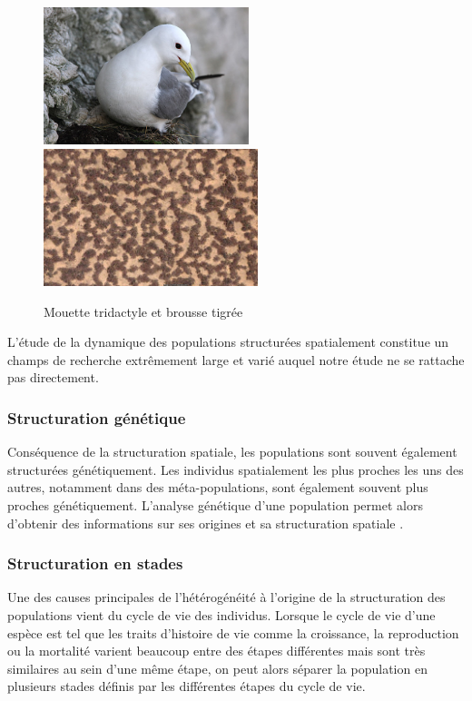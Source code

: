 \begin{figure}[H]
\centering
\includegraphics[height=4cm]{1_CorpsDeThese/EA/Fig/mouette}
\includegraphics[height=4cm]{1_CorpsDeThese/EA/Fig/brousse}
\caption[Mouette tridactyle et brousse
tigrée]{Mouette tridactyle et brousse tigrée}\label{fig:mouette}
\end{figure}

L'étude de la dynamique des populations structurées spatialement constitue un
champs de recherche extrêmement large et varié auquel notre étude ne se rattache
pas directement. 

\subsubsection{Structuration génétique}

Conséquence de la structuration spatiale, les populations sont souvent également
structurées génétiquement. Les individus spatialement les plus proches les uns
des autres, notamment dans des méta-populations, sont également souvent plus
proches génétiquement. L'analyse génétique d'une population permet alors d'obtenir des
informations sur ses origines et sa structuration spatiale
\autocites{repaci2006a,booth2009a,jorde2007a}.

\subsubsection{Structuration en stades}

Une des causes principales de l'hétérogénéité à l'origine de la
structuration des populations vient du cycle de vie des individus. Lorsque le
cycle de vie d'une espèce est tel que les traits d'histoire de vie comme la
croissance, la reproduction ou la mortalité varient beaucoup entre des étapes
différentes mais sont très similaires au sein d'une même étape, on peut alors
séparer la population en plusieurs stades définis par les différentes étapes du
cycle de vie.

